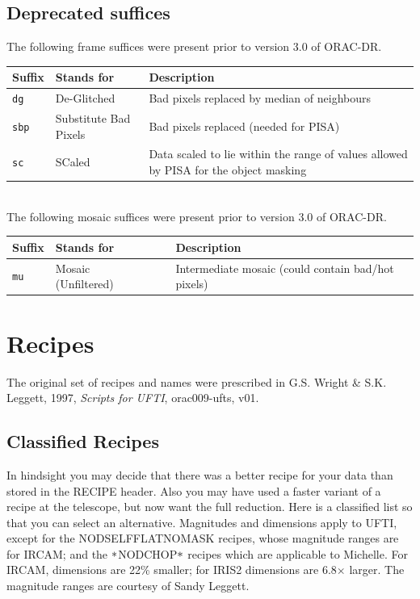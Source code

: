 \documentclass[twoside,11pt]{article}
\newcommand{\htmladdnormallink}[2]{#1}
\newcommand{\xref}[3]{#1}
\newcommand{\xlabel}[1]{}
\renewcommand{\_}{\texttt{\symbol{95}}}
\newcommand{\lsk}{\raisebox{-0.4ex}{\rm *}}
\newcommand{\ORACDR}{{\footnotesize ORAC-DR}}
\newcommand{\PISA}{{\footnotesize PISA}}
\begin{document}
\subsection*{Deprecated suffices}%

The following frame suffices were present prior to version 3.0 of \ORACDR.

\begin{tabular}{llp{90mm}}
\hline
  Suffix   & Stands for        & Description \\ \hline
{\tt\_dg}  & De-Glitched       & Bad pixels replaced by median of neighbours \\ 
{\tt\_sbp} & Substitute Bad Pixels & Bad pixels replaced (needed for \PISA) \\
{\tt\_sc}  & SCaled            & Data scaled to lie within the range of values
                                 allowed by \xref{\PISA}{sun109}{} for the object 
                                 masking \\
\end{tabular}
\\

The following mosaic suffices were present prior to version 3.0 of \ORACDR.

\begin{tabular}{llp{90mm}}
\hline
  Suffix   & Stands for        & Description \\ \hline
{\tt\_mu}  & Mosaic (Unfiltered)~~~ & Intermediate mosaic (could contain
                                      bad/hot pixels) \\
\end{tabular}


\newpage
\section{\xlabel{recipes}Recipes\label{recipes}}

The original set of recipes and names were prescribed in
G.S. Wright \& S.K. Leggett, 1997, {\em Scripts for UFTI}, 
\htmladdnormallink{orac009-ufts, v01}
{http://www.jach.hawaii.edu/JACpublic/UKIRT/software/orac/docs/orac009-ufts-1.html}.

\subsection{\xlabel{classified_recipes}Classified Recipes}

In hindsight you may decide that there was a better recipe for your
data than stored in the RECIPE header.  Also you may have used a
faster variant of a recipe at the telescope, but now want the full
reduction.  Here is a classified list so that you can select an
alternative.  Magnitudes and dimensions apply to UFTI, except for the
NOD\_SELF\_FLAT\_NO\_MASK recipes, whose magnitude ranges are for
IRCAM; and the $\lsk$NOD\_CHOP$\lsk$ recipes which are applicable to
Michelle.  For IRCAM, dimensions are 22\% smaller; for IRIS2 dimensions
are 6.8$\times$ larger.  The magnitude ranges are courtesy of Sandy Leggett.
\bigskip\bigskip
\end{document}
